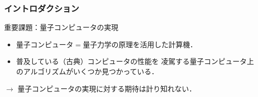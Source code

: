 \documentclass{beamer} %
\newcommand{\0}{\mathbf{0}}
\newcommand{\1}{\mathbf{1}}
\newcommand{\2}{\mathbf{2}}
\begin{document}
\begin{frame}
  \frametitle{イントロダクション}
  \begin{block}{重要課題：量子コンピュータの実現}
    \begin{itemize}
      \item 量子コンピュータ\(=\)量子力学の原理を活用した計算機．
      \item 普及している（古典）コンピュータの性能を
            凌駕する量子コンピュータ上のアルゴリズムがいくつか見つかっている．
    \end{itemize}
    \begin{center}
      \(\longrightarrow\)
      量子コンピュータの実現に対する期待は計り知れない．
    \end{center}
  \end{block}
\end{frame}

\end{document}
